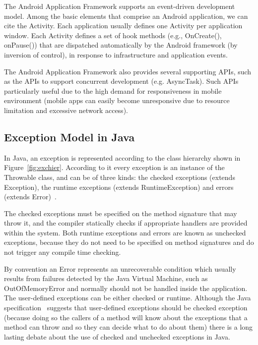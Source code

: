 \documentclass[conference]{IEEEtran}
\begin{document}
The Android Application Framework supports an event-driven development model. 
Among the basic elements that comprise an Android application, we can cite the
Activity. Each application usually defines one Activity per application window.
 Each Activity defines a set of hook methods  (e.g., OnCreate(), onPause()) that are dispatched
automatically by the Android framework (by inversion of
control), in response to infrastructure and application events.

The Android Application Framework also provides several supporting APIs, such as 
the APIs to support concurrent development (e.g. AsyncTask). 
Such APIs particularly useful due to the high demand for responsiveness 
in mobile environment (mobile apps can easily become 
unresponsive due to resource limitation and excessive network access).



\subsection{Exception Model in Java} \label{sec:extypes}

In Java, an exception is represented according to the class hierarchy shown in
Figure~\ref{fig:exchier}.  According to it every exception is an
instance of the Throwable class, and can be of three kinds: the checked exceptions
(extends Exception), the runtime exceptions (extends RuntimeException) and errors
(extends Error)~\cite{gosling2000java}. 

The checked exceptions must be specified on the method signature that may throw it, 
and the compiler statically checks if appropriate handlers are provided within the system.
Both runtime exceptions and errors are known as unchecked exceptions, because 
they do not need to be specified on method signatures and do not trigger any 
compile time checking.

By convention an Error represents an unrecoverable condition which usually results
from failures detected by the Java Virtual Machine, such as OutOfMemoryError and
normally should not be handled inside the application. The user-defined exceptions 
can be either checked or runtime. Although the Java specification~\cite{gosling2000java} 
suggests that user-defined exceptions should be checked exception (because doing so 
the callers of a method will know about the exceptions that a method can throw and so 
they can decide what to do about them) there is a long lasting debate about the use of 
checked and unchecked exceptions in Java. 
\end{document}
